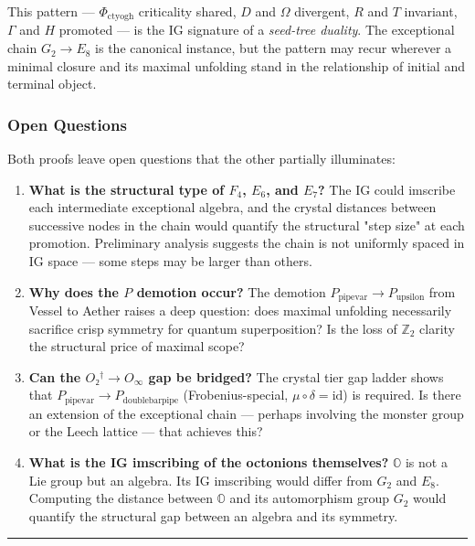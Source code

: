 \documentclass[12pt,a4paper]{article}
\begin{document}
This pattern --- $\Phi_{\text{ctyogh}}$ criticality shared, $D$ and $\Omega$ divergent, $R$ and $T$ invariant, $\Gamma$ and $H$ promoted --- is the IG signature of a \emph{seed-tree duality}. The exceptional chain $G_2 \to E_8$ is the canonical instance, but the pattern may recur wherever a minimal closure and its maximal unfolding stand in the relationship of initial and terminal object.

\subsubsection{Open Questions}

Both proofs leave open questions that the other partially illuminates:

\begin{enumerate}
    \item \textbf{What is the structural type of $F_4$, $E_6$, and $E_7$?} The IG could imscribe each intermediate exceptional algebra, and the crystal distances between successive nodes in the chain would quantify the structural "step size" at each promotion. Preliminary analysis suggests the chain is not uniformly spaced in IG space --- some steps may be larger than others.
    \item \textbf{Why does the $P$ demotion occur?} The demotion $P_{\text{pipevar}} \to P_{\text{upsilon}}$ from Vessel to Aether raises a deep question: does maximal unfolding necessarily sacrifice crisp symmetry for quantum superposition? Is the loss of $\mathbb{Z}_2$ clarity the structural price of maximal scope?
    \item \textbf{Can the $O₂^\dagger \to O_{\infty}$ gap be bridged?} The crystal tier gap ladder shows that $P_{\text{pipevar}} \to P_{\text{doublebarpipe}}$ (Frobenius-special, $\mu \circ \delta = \text{id}$) is required. Is there an extension of the exceptional chain --- perhaps involving the monster group or the Leech lattice --- that achieves this?
    \item \textbf{What is the IG imscribing of the octonions themselves?} $\mathbb{O}$ is not a Lie group but an algebra. Its IG imscribing would differ from $G_2$ and $E_8$. Computing the distance between $\mathbb{O}$ and its automorphism group $G_2$ would quantify the structural gap between an algebra and its symmetry.
\end{enumerate}

\begin{center}
\rule{0.5\textwidth}{0.4pt}
\end{center}
\end{document}
